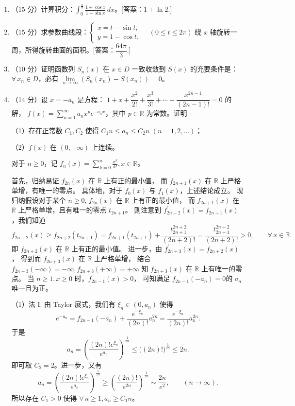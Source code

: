 \begin{enumerate}
\item[二]（15 分）计算积分：$\displaystyle\int_{0}^{\frac{\pi}{2}} \frac{1+\cos x}{1+\sin x}\,dx$。[答案：$1+\ln2$.]

\item[三]（15 分）求参数曲线段：$\begin{cases}x=t-\sin t, \\ y=1-\cos t,\end{cases} \quad(0 \leq t \leq 2 \pi)$ 
绕 $x$ 轴旋转一周，所得旋转曲面的面积。[答案：$\dfrac{64\pi}{3}$.]

\item[四]（10 分）证明函数列 $S_{n}(x)$ 在 $x \in D$ 一致收敛到 $S(x)$ 的充要条件是：
$\forall\, x_{n} \in D$，必有 $\lim\limits_{n \rightarrow \infty}(S_{n}(x_{n})-S(x_{n}))=0$。

\item[五]（14 分）设 $x=-a_{n}$ 是方程： $1+x+\dfrac{x^{2}}{2!}+\dfrac{x^{3}}{3!}+\cdots+\dfrac{x^{2n-1}}{(2n-1)!}=0$ 的解，
$\displaystyle f(x)=\sum_{n=1}^{\infty} a_{n} x^{p} e^{-a_{n} x}$，其中 $p \in \mathbb{R}$ 为常数。证明

（1）存在正常数 $C_{1}, C_{2}$ 使得 $C_{1} n \leq a_{n} \leq C_{2} n$ $(n=1,2, \ldots)$；

（2）$f(x)$ 在 $(0,+\infty)$ 上连续。
\begin{proofc}
对于 $n \geq 0$，记 $\displaystyle f_{n}(x)=\sum_{k=0}^{n} \frac{x^{k}}{k!}, x \in \mathbb{R}$。

首先，归纳易证 $f_{2n}(x)$ 在 $\mathbb{R}$ 上有正的最小值，
而 $f_{2n+1}(x)$ 在 $\mathbb{R}$ 上严格单增，有唯一的零点。
具体地，对于 $f_{0}(x)$ 与 $f_{1}(x)$，上述结论成立。
现归纳假设对于某个 $n \geq 0$, $f_{2n}(x)$ 在 $\mathbb{R}$ 上有正的最小值，
而 $f_{2n+1}(x)$ 在 $\mathbb{R}$ 上严格单增，且有唯一的零点 $t_{2n+1}$。
则注意到 $f_{2n+2}^{\prime}(x)=f_{2n+1}(x)$，我们知道
$$f_{2n+2}(x) \geq f_{2n+2}(t_{2n+1})
=f_{2n+1}(t_{2n+1})+\frac{t_{2n+1}^{2n+2}}{(2n+2)!}
=\frac{t_{2n+1}^{2n+2}}{(2n+2)!}>0, \qquad \forall\, x \in \mathbb{R}.$$
即 $f_{2n+2}(x)$ 在 $\mathbb{R}$ 上有正的最小值。
进一步，由 $f_{2n+3}^{\prime}(x)=f_{2n+2}(x)$，
得到而 $f_{2n+3}(x)$ 在 $\mathbb{R}$ 上严格单增，
结合 $f_{2n+3}(-\infty)=-\infty, f_{2n+3}(+\infty)=+\infty$ 
知 $f_{2n+3}(x)$ 在 $\mathbb{R}$ 上有唯一的零点。
当 $n \geq 1, x \geq 0$ 时，$f_{2n-1}(x)>0$，
可知满足 $f_{2n-1}(-a_{n})=0$的 $a_{n}$ 唯一且为正。

（1）法 I. 由 Taylor 展式，我们有 $\xi_{n} \in (0, a_{n})$ 使得
$$e^{-a_{n}}=f_{2n-1}(-a_{n})+\frac{e^{-\xi_{n}}}{(2n)!} a_{n}^{2n}
=\frac{e^{-\xi_{n}}}{(2n)!} a_{n}^{2n}.$$
于是
$$a_{n}=\left(\frac{(2n)!e^{\xi_{n}}}{e^{a_{n}}}\right)^{\frac{1}{2n}} 
\leq\big((2n)!\big)^{\frac{1}{2n}} \leq 2n.$$
即可取 $C_{2}=2$。进一步，又有
$$a_{n}=\left(\frac{(2n)!e^{\xi_{n}}}{e^{a_{n}}}\right)^{\frac{1}{2n}} 
\geq\left(\frac{(2n)!}{e^{2n}}\right)^{\frac{1}{2n}} 
\sim \frac{2n}{e^{2}}, \qquad(n \rightarrow \infty).$$
所以存在 $C_{1}>0$ 使得 $\forall\, n \geq 1, a_{n} \geq C_{1} n$。


\end{proofc}
\end{enumerate}
